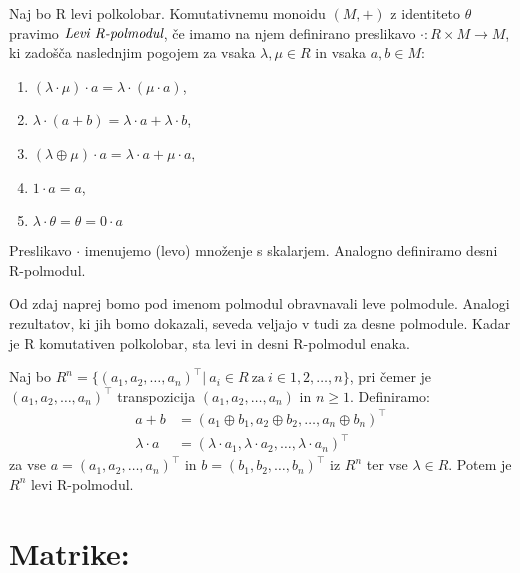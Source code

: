 \documentclass[mat1]{fmfdelo}
\newcommand{\pojem}[1]{\emph{#1}}
\begin{document}
\begin{definicija}
	Naj bo R levi polkolobar. Komutativnemu monoidu $(M, +)$ z identiteto $\theta$ pravimo$~\pojem{Levi R-polmodul}$, če imamo na njem definirano preslikavo \newline $\cdot: R\times M \rightarrow M$, ki zadošča naslednjim pogojem za vsaka $\lambda,\mu\in R$ in vsaka $a, b\in M$:
	\begin{enumerate}
		\item $(\lambda\cdot\mu) \cdot a = \lambda \cdot (\mu \cdot a)$,
		\item $\lambda\cdot(a + b) = \lambda\cdot a + \lambda\cdot b$,
		\item $(\lambda \oplus \mu)\cdot a = \lambda\cdot a + \mu\cdot a$,
		\item $1\cdot a = a$,
		\item $\lambda\cdot\theta = \theta = 0\cdot a$
	\end{enumerate}

Preslikavo $\cdot$ imenujemo (levo) množenje s skalarjem. Analogno definiramo desni R-polmodul.
\end{definicija}

\begin{opomba}
	Od zdaj naprej bomo pod imenom polmodul obravnavali leve polmodule. Analogi rezultatov, ki jih bomo dokazali, seveda veljajo v tudi za desne polmodule. Kadar je R komutativen polkolobar, sta levi in desni R-polmodul enaka.
\end{opomba}

\begin{zgled}
	Naj bo $R^n = \{(a_1, a_2, \ldots, a_n)^{\top} |~ a_i \in R~\text{za}~i\in {1, 2, \ldots, n}\}$, pri čemer je $(a_1, a_2, \ldots, a_n)^{\top}$ transpozicija $(a_1, a_2, \ldots, a_n)$ in $n\geq 1$. Definiramo:\\
	\begin{align}
		a + b &= (a_1 \oplus b_1, a_2 \oplus b_2, \ldots, a_n \oplus b_n)^{\top} \\
		\lambda\cdot a &= (\lambda\cdot a_1,\lambda\cdot a_2, \ldots,\lambda\cdot a_n)^{\top}
	\end{align}
	za vse $a = (a_1, a_2, \ldots, a_n)^{\top}$ in $b = (b_1, b_2, \ldots, b_n)^{\top}$ iz $R^n$ ter vse $\lambda \in R$. Potem je $R^n$ levi R-polmodul.
\end{zgled}

\pagebreak
\section{Matrike:}
\end{document}
